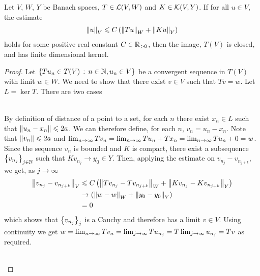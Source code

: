 \documentclass[12pt]{article}
\begin{document}
\begin{ftheorem} 
    Let $V$, $W$, $Y$ be Banach spaces, $T \in \L(V, W)$ and $K \in \K(V, Y)$. If for all $u \in V$, the estimate 
    \begin{align*}
    \norm[u]_V \leq C \brac{\norm[Tu]_W + \norm[Ku]_Y}
    \end{align*}
    holds for some positive real constant $C \in \R_{> 0}$, then the image, $T(V)$ is closed, and has finite dimensional kernel. 
\end{ftheorem}
\begin{proof}
    Let $\set{Tu_n \in T(V) \wh n \in \N, u_n \in V}$ be a convergent sequence in $T(V)$ with limit $w \in W$. We need to show that there exist $v \in V$ such that $T v = w$. Let $L = \ker T$. There are two cases 
    
    \begin{case} \hfill \\
        By definition of distance of a point to a set, for each $n$ there exist $x_n \in L$ such that $\norm[u_n - x_n] \leq 2a$. We can therefore define, for each $n$, $v_n = u_n - x_n$. Note that $\norm[v_n] \leq 2a$ and $\Lim Tv_n = \Lim T u_n + Tx_n = \Lim Tu_n + 0 = w$. Since the sequence $v_n$ is bounded and $K$ is compact, there exist a subsequence $\set{v_{n_j}}_{j \in \N}$ such that $Kv_{n_j} \to y_0 \in Y$. Then, applying the estimate on $v_{n_j} - v_{n_{j + k}}$, we get, as $j \to \infty$
        \begin{align*}
        \norm[v_{n_j} - v_{n_{j + k}}]_V 
        & \leq C \brac{\norm[Tv_{n_j} - Tv_{n_{j + k}}]_W + \norm[Kv_{n_j} - Kv_{n_{j + k}}]_Y} \\
        & \to  \brac{\norm[w - w]_W + \norm[y_0 - y_0]_Y} \\
        & = 0 
        \end{align*}
        which shows that $\set{v_{n_j}}_j$ is a Cauchy and therefore has a limit $v \in V$. Using continuity we get $w = \Lim Tv_{n} = \Lim[j] Tu_{n_j} = T \Lim[j] u_{n_j} = Tv$ as required. 
    \end{case} \hfill \\
    

\end{proof}
\end{document}
